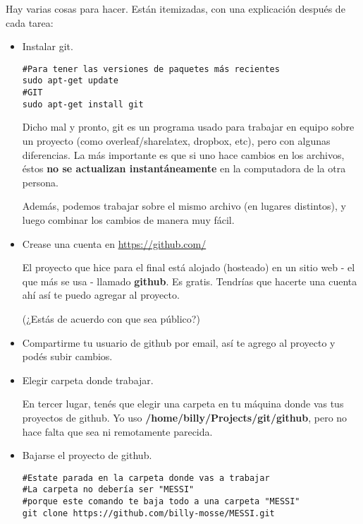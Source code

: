 \documentclass[10pt,a4paper]{report}
\begin{document}
Hay varias cosas para hacer. Están itemizadas, con una explicación después de cada tarea:


\begin{itemize}

	\item Instalar git. 
\begin{lstlisting}
#Para tener las versiones de paquetes más recientes
sudo apt-get update
#GIT
sudo apt-get install git
\end{lstlisting}

Dicho mal y pronto, git es un programa usado para trabajar en equipo sobre un proyecto (como overleaf/sharelatex, dropbox, etc), pero con algunas diferencias. La más importante es que si uno hace cambios en los archivos, éstos \textbf{no se actualizan instantáneamente} en la computadora de la otra persona.

Además, podemos trabajar sobre el mismo archivo (en lugares distintos), y luego combinar los cambios de manera muy fácil.

\item Crease una cuenta en \url{https://github.com/}

El proyecto que hice para el final está alojado (hosteado) en un sitio web - el que más se usa - llamado \textbf{github}. Es gratis. Tendrías que hacerte una cuenta ahí así te puedo agregar al proyecto.

(¿Estás de acuerdo con que sea público?)

\item Compartirme tu usuario de github por email, así te agrego al proyecto y podés subir cambios.

\item Elegir carpeta donde trabajar.

En tercer lugar, tenés que elegir una carpeta en tu máquina donde vas tus proyectos de github. Yo uso \textbf{/home/billy/Projects/git/github}, pero no hace falta que sea ni remotamente parecida.

\item Bajarse el proyecto de github.

\begin{lstlisting}
#Estate parada en la carpeta donde vas a trabajar
#La carpeta no debería ser "MESSI"
#porque este comando te baja todo a una carpeta "MESSI"
git clone https://github.com/billy-mosse/MESSI.git
\end{lstlisting}


\end{itemize}
\end{document}

